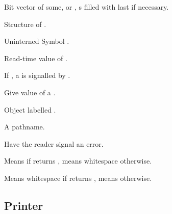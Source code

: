 \begin{LIST}{1cm}
  {
  \index{\#*}%
  Bit vector of some, or ,
  s filled with last  if necessary.
  }

  {
  Structure of .
  }

  {
  Uninterned Symbol .
  }

  {
  Read-time value of .
  }

  {
  If \NIL, a  is signalled by .
  }

  {
  \index{\#=}%
  Give value of  a .
  }

  {
  \index{\#\#}%
  Object labelled .
  }

  {
  A pathname.
  }

  \IT{\KWD{\#\boldmath$<$}}
  {
  Have the reader signal an error.
  }

  {
  Means  if  returns \T, means whitespace
  otherwise. 
  }

  {
  Means whitespace if  returns \T, means  
  otherwise. 
  }

\end{LIST}


\subsection{Printer} 


